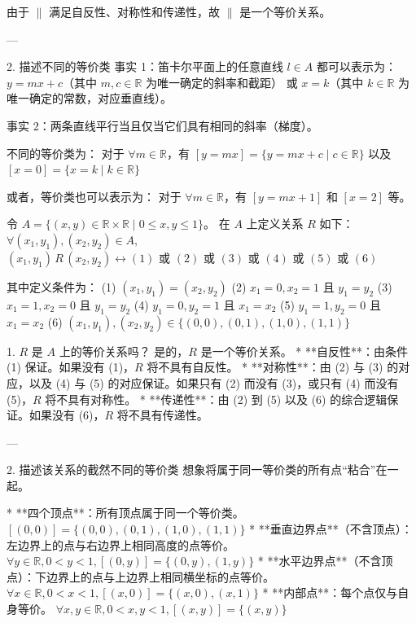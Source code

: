 \begin{questions}
\begin{solution}
由于 $\parallel$ 满足自反性、对称性和传递性，故 $\parallel$ 是一个等价关系。

---

 2. 描述不同的等价类
事实 1：笛卡尔平面上的任意直线 $l \in A$ 都可以表示为：
$y = mx + c$（其中 $m, c \in \mathbb{R}$ 为唯一确定的斜率和截距）
或 $x = k$（其中 $k \in \mathbb{R}$ 为唯一确定的常数，对应垂直线）。

事实 2：两条直线平行当且仅当它们具有相同的斜率（梯度）。

不同的等价类为：
对于 $\forall m \in \mathbb{R}$，有 $[y = mx] = \{y = mx + c \mid c \in \mathbb{R}\}$
以及 $[x = 0] = \{x = k \mid k \in \mathbb{R}\}$

或者，等价类也可以表示为：
对于 $\forall m \in \mathbb{R}$，有 $[y = mx + 1]$ 和 $[x = 2]$ 等。
\end{solution}

\question 
令 $A = \{(x, y) \in \mathbb{R} \times \mathbb{R} \mid 0 \leq x, y \leq 1\}$。
在 $A$ 上定义关系 $R$ 如下：$\forall (x_1, y_1), (x_2, y_2) \in A,$
$(x_1, y_1) \, R \, (x_2, y_2) \leftrightarrow (1) \text{ 或 } (2) \text{ 或 } (3) \text{ 或 } (4) \text{ 或 } (5) \text{ 或 } (6)$

其中定义条件为：
(1) $(x_1, y_1) = (x_2, y_2)$
(2) $x_1 = 0, x_2 = 1$ 且 $y_1 = y_2$
(3) $x_1 = 1, x_2 = 0$ 且 $y_1 = y_2$
(4) $y_1 = 0, y_2 = 1$ 且 $x_1 = x_2$
(5) $y_1 = 1, y_2 = 0$ 且 $x_1 = x_2$
(6) $(x_1, y_1), (x_2, y_2) \in \{(0, 0), (0, 1), (1, 0), (1, 1)\}$

\begin{solution}
 1. $R$ 是 $A$ 上的等价关系吗？
是的，$R$ 是一个等价关系。
* **自反性**：由条件 (1) 保证。如果没有 (1)，$R$ 将不具有自反性。
* **对称性**：由 (2) 与 (3) 的对应，以及 (4) 与 (5) 的对应保证。如果只有 (2) 而没有 (3)，或只有 (4) 而没有 (5)，$R$ 将不具有对称性。
* **传递性**：由 (2) 到 (5) 以及 (6) 的综合逻辑保证。如果没有 (6)，$R$ 将不具有传递性。

---

 2. 描述该关系的截然不同的等价类
想象将属于同一等价类的所有点“粘合”在一起。

* **四个顶点**：所有顶点属于同一个等价类。
    $[(0, 0)] = \{(0, 0), (0, 1), (1, 0), (1, 1)\}$
* **垂直边界点**（不含顶点）：左边界上的点与右边界上相同高度的点等价。
    $\forall y \in \mathbb{R}, 0 < y < 1, [(0, y)] = \{(0, y), (1, y)\}$
* **水平边界点**（不含顶点）：下边界上的点与上边界上相同横坐标的点等价。
    $\forall x \in \mathbb{R}, 0 < x < 1, [(x, 0)] = \{(x, 0), (x, 1)\}$
* **内部点**：每个点仅与自身等价。
    $\forall x, y \in \mathbb{R}, 0 < x, y < 1, [(x, y)] = \{(x, y)\}$


\end{solution}
\end{questions}
